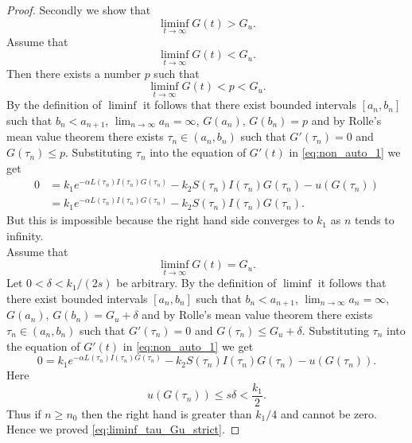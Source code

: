 \documentclass[pdflatex,sn-mathphys-num]{sn-jnl}
\theoremstyle{thmstyleone}
\theoremstyle{thmstyletwo}
\theoremstyle{thmstylethree}
\begin{document}
\begin{proof}
Secondly we show that 
\begin{equation}\label{eq:liminf_tau_Gu_strict}
\liminf_{t\to\infty}G(t)> G_u.
\end{equation}
Assume that 
\begin{equation}
\liminf_{t\to\infty} G(t)<G_u.
\end{equation}
Then there exists a number $p$ such that 
\begin{equation}
\liminf_{t\to\infty}G(t)<p<G_u.
\end{equation}
By the definition of $\liminf$ it follows that there exist bounded intervals 
$[a_n,b_n]$ such that $b_n<a_{n+1}$, 
$\displaystyle{\lim_{n\to\infty}}a_n=\infty$, $G(a_n),\,G(b_n)=p$ and 
by Rolle's mean value theorem there 
exists $\tau_n\in (a_n,b_n)$ such that $G'(\tau_n)=0$ and 
$G(\tau_n)\leq p$.  
Substituting $\tau_n$ into the equation of $G'(t)$ in 
\eqref{eq:non_auto_1} we get
\begin{align*}\label{eq:liminf_tau_Gu}
0&=k_1e^{-\alpha L(\tau_n)I(\tau_n)G(\tau_n)}-
k_2S(\tau_n)I(\tau_n)G(\tau_n)-u(G(\tau_n))\\
&=k_1e^{-\alpha L(\tau_n)I(\tau_n)G(\tau_n)}-
k_2S(\tau_n)I(\tau_n)G(\tau_n).
\end{align*}
But this is impossible because the right hand side converges to $k_1$ 
as $n$ tends to infinity. \\
Assume that 
\begin{equation}
\liminf_{t\to\infty} G(t)=G_u.
\end{equation}
Let $0<\delta<k_1/(2s)$ be arbitrary.  
By the definition of $\liminf$ it follows that there exist bounded intervals 
$[a_n,b_n]$ such that $b_n<a_{n+1}$, 
$\displaystyle{\lim_{n\to\infty}}a_n=\infty$, $G(a_n),\,G(b_n)=G_u+
\delta$ and 
by Rolle's mean value theorem there 
exists $\tau_n\in (a_n,b_n)$ such that $G'(\tau_n)=0$ and 
$G(\tau_n)\leq G_u+\delta$.  
Substituting $\tau_n$ into the equation of $G'(t)$ in 
\eqref{eq:non_auto_1} we get
\begin{equation}\label{eq:liminf_tau2}
0=k_1e^{-\alpha L(\tau_n)I(\tau_n)G(\tau_n)}-
k_2S(\tau_n)I(\tau_n)G(\tau_n)-u(G(\tau_n)).
\end{equation}
Here 
\begin{equation*}
u(G(\tau_n))\leq s\delta<\frac{k_1}{2}.
\end{equation*}
Thus if $n\geq n_0$ then the right hand is greater than $k_1/4$ and 
cannot be zero. \\
Hence we proved \eqref{eq:liminf_tau_Gu_strict}.


\end{proof}
\end{document}
